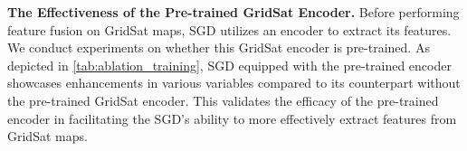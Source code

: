 \noindent \textbf{The Effectiveness of the Pre-trained GridSat Encoder.} 
Before performing feature fusion on GridSat maps, SGD utilizes an encoder to extract its features. 
We conduct experiments on whether this GridSat encoder is pre-trained.
As depicted in \cref{tab:ablation_training}, SGD equipped with the pre-trained encoder showcases enhancements in various variables compared to its counterpart without the pre-trained GridSat encoder. 
This validates the efficacy of the pre-trained encoder in facilitating the SGD's ability to more effectively extract features from GridSat maps. 

